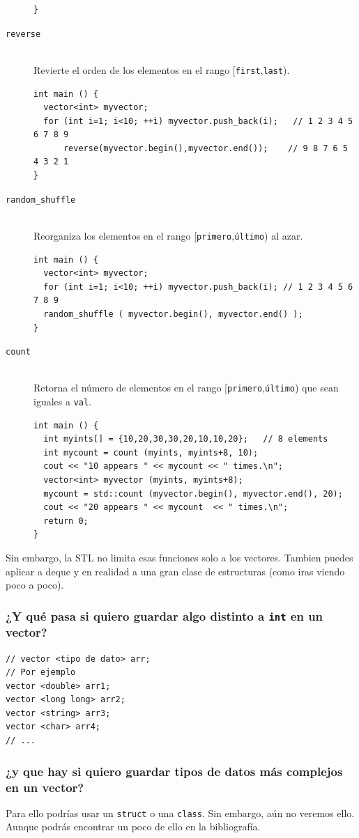 \documentclass[a4paper,12pt]{article}
\begin{document}
\begin{description}
\begin{lstlisting}
}
\end{lstlisting}
\item[\texttt{reverse}] \hfill \\Revierte el orden de los elementos en el rango [\texttt{first},\texttt{last}).
\begin{lstlisting}
int main () {
  vector<int> myvector;
  for (int i=1; i<10; ++i) myvector.push_back(i);   // 1 2 3 4 5 6 7 8 9
  	  reverse(myvector.begin(),myvector.end());    // 9 8 7 6 5 4 3 2 1
}
\end{lstlisting}
\item[\texttt{random\_shuffle}]\hfill \\Reorganiza los elementos en el rango [\texttt{primero},\texttt{último}) al azar.
\begin{lstlisting}
int main () {
  vector<int> myvector;
  for (int i=1; i<10; ++i) myvector.push_back(i); // 1 2 3 4 5 6 7 8 9
  random_shuffle ( myvector.begin(), myvector.end() );
}
\end{lstlisting}
\item[\texttt{count}] \hfill \\Retorna el número de elementos en el rango [\texttt{primero},\texttt{último}) que sean iguales a \texttt{val}.
\begin{lstlisting}
int main () {
  int myints[] = {10,20,30,30,20,10,10,20};   // 8 elements
  int mycount = count (myints, myints+8, 10);
  cout << "10 appears " << mycount << " times.\n";
  vector<int> myvector (myints, myints+8);
  mycount = std::count (myvector.begin(), myvector.end(), 20);
  cout << "20 appears " << mycount  << " times.\n";
  return 0;
}
\end{lstlisting}
\end{description}
Sin embargo, la STL no limita esas funciones solo a los vectores. Tambien puedes aplicar a deque y en realidad a una gran clase de estructuras (como iras viendo poco a poco).
\subsubsection*{¿Y qué pasa si quiero guardar algo distinto a \texttt{int} en un vector?}
\begin{lstlisting}
// vector <tipo de dato> arr;
// Por ejemplo
vector <double> arr1;
vector <long long> arr2;
vector <string> arr3;
vector <char> arr4;
// ...
\end{lstlisting}
\subsubsection*{¿y que hay si quiero guardar tipos de datos más complejos en un vector?}
Para ello podrías usar un \texttt{struct} o una \texttt{class}. Sin embargo, aún no veremos ello. Aunque podrás encontrar un poco de ello en la bibliografía.
\end{document}
